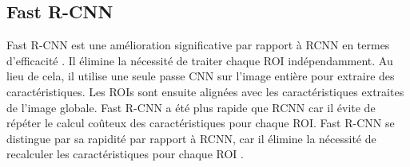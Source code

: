 \subsection{Fast R-CNN} 
Fast R-CNN est une amélioration significative par rapport à RCNN en termes d'efficacité \cite{ren2015fasterarxiv}. Il élimine la nécessité de traiter chaque ROI indépendamment. Au lieu de cela, il utilise une seule passe CNN sur l'image entière pour extraire des caractéristiques. Les ROIs sont ensuite alignées avec les caractéristiques extraites de l'image globale.
Fast R-CNN a été plus rapide que RCNN car il évite de répéter le calcul coûteux des caractéristiques pour chaque ROI.
Fast R-CNN se distingue par sa rapidité par rapport à RCNN, car il élimine la nécessité de recalculer les caractéristiques  pour chaque ROI \cite{ch2_The5Comp69}.


